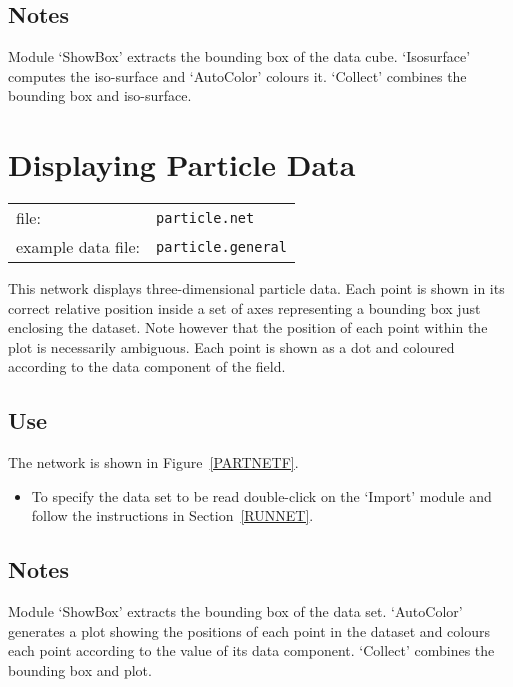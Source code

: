 \subsection{Notes}

Module `ShowBox' extracts the bounding box of the data cube.
`Isosurface' computes the iso-surface and `AutoColor' colours it.
`Collect' combines the bounding box and iso-surface.


\newpage
\section{Displaying Particle Data}


\begin{tabular}{ll}
file:              & {\tt particle.net}     \\
example data file: & {\tt particle.general} \\
\end{tabular}

This network displays three-dimensional particle data. Each point is
shown in its correct relative position inside a set of axes representing
a bounding box just enclosing the dataset. Note however that the
position of each point within the plot is necessarily ambiguous. Each
point is shown as a dot and coloured according to the data component of
the field.

\subsection{Use}

The network is shown in Figure~\ref{PARTNETF}.

\begin{itemize}

  \item To specify the data set to be read double-click on the `Import'
   module and follow the instructions in Section~\ref{RUNNET}.

\end{itemize}

\subsection{Notes}

Module `ShowBox' extracts the bounding box of the data set. `AutoColor'
generates a plot showing the positions of each point in the dataset and 
colours each point according to the value of its data component.
`Collect' combines the bounding box and plot.

